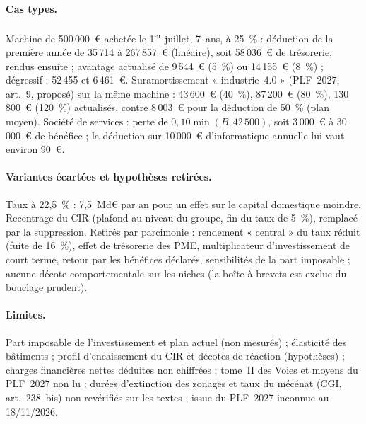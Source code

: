 \paragraph{Cas types.} Machine de 500\,000~€ achetée le 1\textsuperscript{er} juillet, 7~ans, à 25~\% : déduction de la
première année de 35\,714 à 267\,857~€ (linéaire), soit 58\,036~€ de trésorerie, rendus ensuite ; avantage actualisé de
9\,544~€ (5~\%) ou 14\,155~€ (8~\%) ; dégressif : 52\,455 et 6\,461~€. Suramortissement « industrie~4.0 » (PLF~2027, art.~9,
proposé) sur la même machine : 43\,600~€ (40~\%), 87\,200~€ (80~\%), 130\,800~€ (120~\%) actualisés, contre 8\,003~€ pour la
déduction de 50~\% (plan moyen). Société de services : perte de $0{,}10\min(B, 42\,500)$, soit 3\,000~€ à 30\,000~€ de
bénéfice ; la déduction sur 10\,000~€ d'informatique annuelle lui vaut environ 90~€.

\paragraph{Variantes écartées et hypothèses retirées.} Taux à 22,5~\% : 7,5~Md€ par an pour un effet sur le capital
domestique moindre. Recentrage du CIR (plafond au niveau du groupe, fin du taux de 5~\%), remplacé par la suppression. Retirés par parcimonie : rendement « central » du taux
réduit (fuite de 16~\%), effet de trésorerie des PME, multiplicateur d'investissement de court terme, retour par les
bénéfices déclarés, sensibilités de la part imposable ; aucune décote comportementale sur les niches (la boîte à brevets
est exclue du bouclage prudent).

\paragraph{Limites.} Part imposable de l'investissement et plan actuel (non mesurés) ; élasticité des bâtiments ;
profil d'encaissement du CIR et décotes de réaction (hypothèses) ; charges financières nettes déduites non chiffrées ; tome~II des Voies et moyens du PLF~2027 non lu ; durées d'extinction des
zonages et taux du mécénat (CGI, art.~238~bis) non revérifiés sur les textes ; issue du PLF~2027 inconnue au 18/11/2026.
